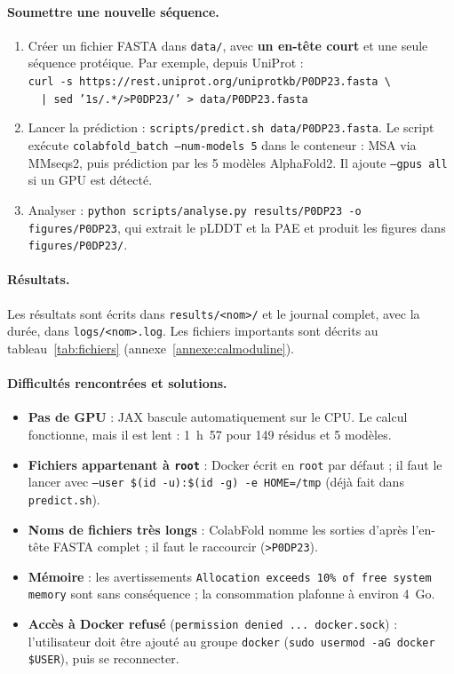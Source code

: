 \paragraph{Soumettre une nouvelle séquence.}
\begin{enumerate}
  \item Créer un fichier FASTA dans \texttt{data/}, avec \textbf{un en-tête court} et une seule séquence protéique. Par exemple, depuis UniProt :\\
  \texttt{curl -s https://rest.uniprot.org/uniprotkb/P0DP23.fasta \textbackslash}\\
  \texttt{\ \ | sed '1s/.*/>P0DP23/' > data/P0DP23.fasta}
  \item Lancer la prédiction : \texttt{scripts/predict.sh data/P0DP23.fasta}. Le script exécute \texttt{colabfold\_batch --num-models 5} dans le conteneur : MSA via MMseqs2, puis prédiction par les 5 modèles AlphaFold2. Il ajoute \texttt{--gpus all} si un GPU est détecté.
  \item Analyser : \texttt{python scripts/analyse.py results/P0DP23 -o figures/P0DP23}, qui extrait le pLDDT et la PAE et produit les figures dans \texttt{figures/P0DP23/}.
\end{enumerate}

\paragraph{Résultats.} \sloppy Les résultats sont écrits dans \texttt{results/<nom>/} et le journal complet, avec la durée, dans \texttt{logs/<nom>.log}. Les fichiers importants sont décrits au tableau~\ref{tab:fichiers} (annexe~\ref{annexe:calmoduline}).\par\fussy

\paragraph{Difficultés rencontrées et solutions.}
\begin{itemize}
  \item \textbf{Pas de GPU} : JAX bascule automatiquement sur le CPU. Le calcul fonctionne, mais il est lent : 1~h~57 pour 149 résidus et 5 modèles.
  \item \textbf{Fichiers appartenant à \texttt{root}} : Docker écrit en \texttt{root} par défaut ; il faut le lancer avec \texttt{--user \$(id -u):\$(id -g) -e HOME=/tmp} (déjà fait dans \texttt{predict.sh}).
  \item \textbf{Noms de fichiers très longs} : ColabFold nomme les sorties d'après l'en-tête FASTA complet ; il faut le raccourcir (\texttt{>P0DP23}).
  \item \textbf{Mémoire} : les avertissements \texttt{Allocation exceeds 10\% of free system memory} sont sans conséquence ; la consommation plafonne à environ 4~Go.
  \item \textbf{Accès à Docker refusé} (\texttt{permission denied ... docker.sock}) : l'utilisateur doit être ajouté au groupe \texttt{docker} (\texttt{sudo usermod -aG docker \$USER}), puis se reconnecter.
\end{itemize}

